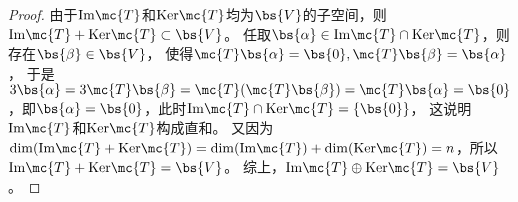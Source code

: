 \documentclass[12pt, a4paper, oneside, UTF8]{ctexbook}
\begin{document}
\begin{proof}
    由于$\mathrm{Im}\mc{T}$和$\mathrm{Ker}\mc{T}$均为$\bs{V}$的子空间，则
    $\mathrm{Im}\mc{T}+ \mathrm{Ker}\mc{T} \subset \bs{V}$。
    任取$\bs{\alpha}\in \mathrm{Im}\mc{T}\cap \mathrm{Ker}\mc{T}$，则存在$\bs{\beta}\in \bs{V}$，
    使得$\mc{T}\bs{\alpha}=\bs{0},\mc{T} \bs{\beta}=\bs{\alpha} $，
    于是$3\bs{\alpha}=3\mc{T}\bs{\beta}=\mc{T}(\mc{T} \bs{\beta})=
    \mc{T}\bs{\alpha}=\bs{0}$，即$\bs{\alpha}=\bs{0}$，此时$\mathrm{Im}\mc{T}\cap \mathrm{Ker}\mc{T}=\{\bs{0}\}$，
    这说明$\mathrm{Im}\mc{T}$和$\mathrm{Ker}\mc{T}$构成直和。
    又因为$\mathrm{dim}(\mathrm{Im}\mc{T}+\mathrm{Ker}\mc{T})=\mathrm{dim}(\mathrm{Im}\mc{T})
    +\mathrm{dim}(\mathrm{Ker}\mc{T})=n$，所以$\mathrm{Im}\mc{T}+ \mathrm{Ker}\mc{T} = \bs{V}$。
    综上，$\mathrm{Im}\mc{T}\oplus \mathrm{Ker}\mc{T} = \bs{V}$。
    
\end{proof}


\ifx\allfiles\undefined
\end{document}
